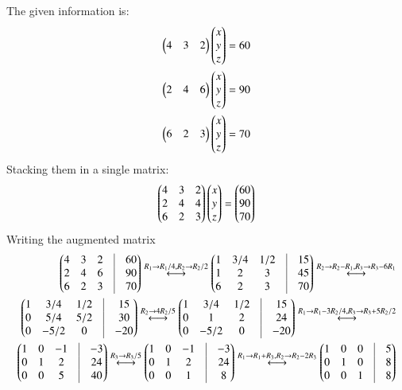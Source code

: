 \documentclass[journal,12pt,onecolumn]{IEEEtran}
\theoremstyle{remark}
\begin{document}
The given information is:
\begin{align}
    \begin{pmatrix}4 & 3 & 2\end{pmatrix}\begin{pmatrix}x \\ y \\ z\end{pmatrix}=60 \\
    \begin{pmatrix}2 & 4 & 6\end{pmatrix}\begin{pmatrix}x \\ y \\ z\end{pmatrix}=90 \\
    \begin{pmatrix}6 & 2 & 3\end{pmatrix}\begin{pmatrix}x \\ y \\ z\end{pmatrix}=70 
\end{align}
Stacking them in a single matrix:
\begin{align}
    \begin{pmatrix}4 & 3 & 2 \\ 2 &  4& 4 \\ 6 & 2 & 3\end{pmatrix}\begin{pmatrix}x \\ y \\ z\end{pmatrix}=\begin{pmatrix}60 \\ 90 \\ 70\end{pmatrix}
\end{align}
Writing the augmented matrix
\begin{align}
    \myvec{4 & 3 & 2 & \vrule & 60 \\ 2 &  4& 6 & \vrule & 90\\ 6 & 2 & 3& \vrule & 70}
    \overset{R_1 \rightarrow R_1 /4, R_2 \rightarrow R_2/2}{\longleftrightarrow}
    \myvec{1 & 3/4 & 1/2 & \vrule & 15 \\ 1 &  2& 3 & \vrule & 45\\ 6 & 2 & 3& \vrule & 70}
    \overset{R_2\rightarrow R_2-R_1, R_3 \rightarrow R_3 - 6R_1}{\longleftrightarrow}\\
    \myvec{1 & 3/4 & 1/2 & \vrule & 15 \\ 0 &  5/4& 5/2 & \vrule & 30\\ 0 & -5/2 & 0& \vrule & -20}\overset{R_2 \rightarrow 4R_2/5}{\longleftrightarrow}
    \myvec{1 & 3/4 & 1/2 & \vrule & 15 \\ 0 &  1& 2 & \vrule & 24\\ 0 & -5/2 & 0& \vrule & -20} \overset{R_1 \rightarrow R_1 - 3R_2/4, R_3 \rightarrow R_3 + 5R_2/2}{\longleftrightarrow}\\
    \myvec{1 & 0 & -1 & \vrule & -3 \\ 0 &  1& 2 & \vrule & 24\\ 0 & 0 & 5& \vrule & 40}
    \overset{R_3 \rightarrow R_3/5}{\longleftrightarrow}\myvec{1 & 0 & -1 & \vrule & -3 \\ 0 &  1& 2 & \vrule & 24\\ 0 & 0 & 1& \vrule & 8} \overset{R_1 \rightarrow R_1 + R_3, R_2 \rightarrow R_2 - 2R_3}{\longleftrightarrow}\myvec{1 & 0 & 0 & \vrule & 5 \\ 0 &  1& 0 & \vrule & 8\\ 0 & 0 & 1& \vrule & 8}
\end{align}
\end{document}
